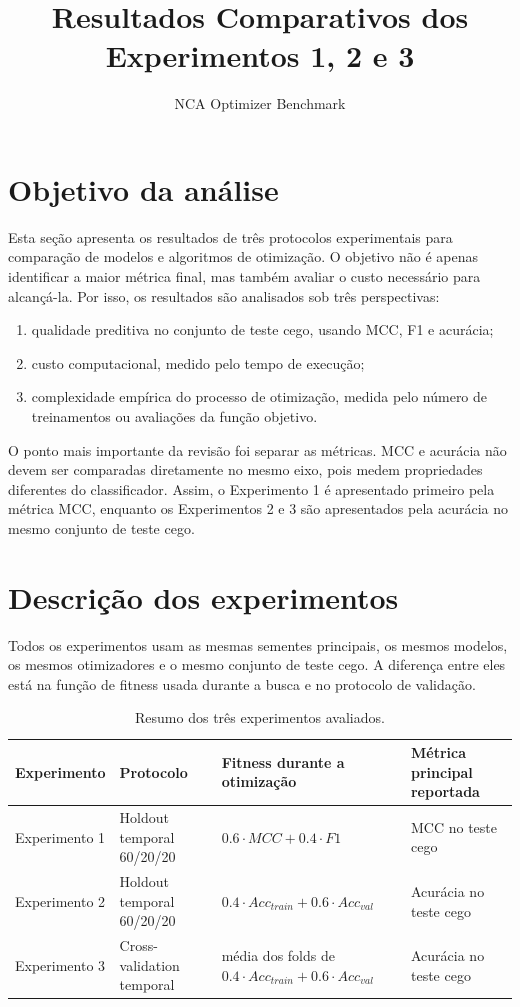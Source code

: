 \documentclass[12pt,a4paper]{article}
\title{Resultados Comparativos dos Experimentos 1, 2 e 3}
\author{NCA Optimizer Benchmark}
\date{}
\begin{document}
\maketitle

\section{Objetivo da análise}

Esta seção apresenta os resultados de três protocolos experimentais para comparação de modelos e algoritmos de otimização. O objetivo não é apenas identificar a maior métrica final, mas também avaliar o custo necessário para alcançá-la. Por isso, os resultados são analisados sob três perspectivas:

\begin{enumerate}
    \item qualidade preditiva no conjunto de teste cego, usando MCC, F1 e acurácia;
    \item custo computacional, medido pelo tempo de execução;
    \item complexidade empírica do processo de otimização, medida pelo número de treinamentos ou avaliações da função objetivo.
\end{enumerate}

O ponto mais importante da revisão foi separar as métricas. MCC e acurácia não devem ser comparadas diretamente no mesmo eixo, pois medem propriedades diferentes do classificador. Assim, o Experimento 1 é apresentado primeiro pela métrica MCC, enquanto os Experimentos 2 e 3 são apresentados pela acurácia no mesmo conjunto de teste cego.

\section{Descrição dos experimentos}

Todos os experimentos usam as mesmas sementes principais, os mesmos modelos, os mesmos otimizadores e o mesmo conjunto de teste cego. A diferença entre eles está na função de fitness usada durante a busca e no protocolo de validação.

\begin{table}[H]
\centering
\caption{Resumo dos três experimentos avaliados.}
\label{tab:experimentos}
\begin{tabular}{p{2.4cm}p{4.0cm}p{4.2cm}p{3.5cm}}
\toprule
Experimento & Protocolo & Fitness durante a otimização & Métrica principal reportada \\
\midrule
Experimento 1 & Holdout temporal 60/20/20 & $0.6 \cdot MCC + 0.4 \cdot F1$ & MCC no teste cego \\
Experimento 2 & Holdout temporal 60/20/20 & $0.4 \cdot Acc_{train} + 0.6 \cdot Acc_{val}$ & Acurácia no teste cego \\
Experimento 3 & Cross-validation temporal & média dos folds de $0.4 \cdot Acc_{train} + 0.6 \cdot Acc_{val}$ & Acurácia no teste cego \\
\bottomrule
\end{tabular}
\end{table}
\end{document}
